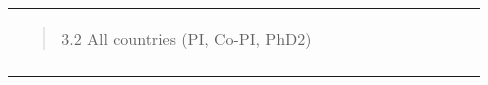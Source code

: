 \begin{longtable}[]{@{}lllllllllll@{}}
\begin{minipage}[t]{0.07\columnwidth}
\begin{quote}
3.2 All countries (PI, Co-PI, PhD2) \end{quote}\strut \end{minipage} & \begin{minipage}[t]{0.07\columnwidth}\raggedright \strut \end{minipage} & \begin{minipage}[t]{0.07\columnwidth}\raggedright \strut \end{minipage} & \begin{minipage}[t]{0.07\columnwidth}\raggedright \strut \end{minipage} & \begin{minipage}[t]{0.07\columnwidth}\raggedright \strut \end{minipage} & \begin{minipage}[t]{0.07\columnwidth}\raggedright \strut \end{minipage} & \begin{minipage}[t]{0.07\columnwidth}\raggedright \strut \end{minipage} & \begin{minipage}[t]{0.07\columnwidth}\raggedright \strut \end{minipage} & \begin{minipage}[t]{0.07\columnwidth}\raggedright \strut \end{minipage} & \begin{minipage}[t]{0.07\columnwidth}\raggedright \strut \end{minipage} & \begin{minipage}[t]{0.07\columnwidth}\raggedright \strut \end{minipage}\tabularnewline \begin{minipage}[t]{0.07\columnwidth}\raggedright \strut \end{minipage} & \begin{minipage}[t]{0.07\columnwidth}\raggedright \strut \end{minipage} & \begin{minipage}[t]{0.07\columnwidth}\raggedright \strut \end{minipage} & \begin{minipage}[t]{0.07\columnwidth}\raggedright \strut \end{minipage} & \begin{minipage}[t]{0.07\columnwidth}\raggedright \strut \end{minipage} & \begin{minipage}[t]{0.07\columnwidth}\raggedright \strut \end{minipage} & \begin{minipage}[t]{0.07\columnwidth}\raggedright \strut \end{minipage} & \begin{minipage}[t]{0.07\columnwidth}\raggedright \strut \end{minipage} & \begin{minipage}[t]{0.07\columnwidth}\raggedright \strut \end{minipage} & 
\end{quote}
\end{minipage}
\end{longtable}
